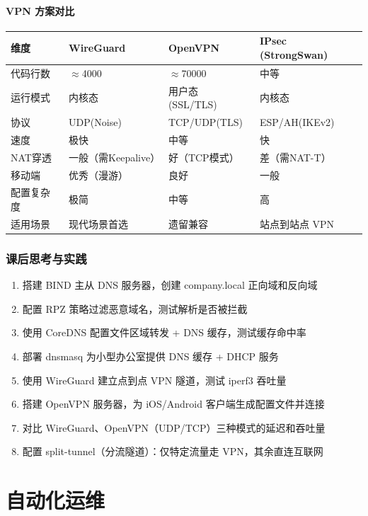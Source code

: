 \documentclass[12pt,UTF8]{ctexbook}
\begin{document}
\subsection{VPN 方案对比}

\begin{tabular}{|p{2.5cm}|p{3cm}|p{3.5cm}|p{3cm}|}
\hline
\textbf{维度} & \textbf{WireGuard} & \textbf{OpenVPN} & \textbf{IPsec (StrongSwan)} \\
\hline
代码行数 & $\approx$4000 & $\approx$70000 & 中等 \\
\hline
运行模式 & 内核态 & 用户态 (SSL/TLS) & 内核态 \\
\hline
协议 & UDP(Noise) & TCP/UDP(TLS) & ESP/AH(IKEv2) \\
\hline
速度 & 极快 & 中等 & 快 \\
\hline
NAT穿透 & 一般（需Keepalive） & 好（TCP模式） & 差（需NAT-T） \\
\hline
移动端 & 优秀（漫游） & 良好 & 一般 \\
\hline
配置复杂度 & 极简 & 中等 & 高 \\
\hline
适用场景 & 现代场景首选 & 遗留兼容 & 站点到站点 VPN \\
\hline
\end{tabular}

\section{课后思考与实践}
\label{sec:network-services-practice}
\begin{enumerate}
    \item 搭建 BIND 主从 DNS 服务器，创建 company.local 正向域和反向域
    \item 配置 RPZ 策略过滤恶意域名，测试解析是否被拦截
    \item 使用 CoreDNS 配置文件区域转发 + DNS 缓存，测试缓存命中率
    \item 部署 dnsmasq 为小型办公室提供 DNS 缓存 + DHCP 服务
    \item 使用 WireGuard 建立点到点 VPN 隧道，测试 iperf3 吞吐量
    \item 搭建 OpenVPN 服务器，为 iOS/Android 客户端生成配置文件并连接
    \item 对比 WireGuard、OpenVPN（UDP/TCP）三种模式的延迟和吞吐量
    \item 配置 split-tunnel（分流隧道）：仅特定流量走 VPN，其余直连互联网
\end{enumerate}

\part{自动化运维}
\end{document}
